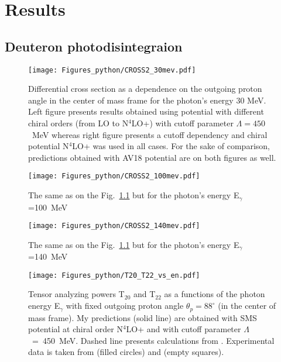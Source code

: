 \chapter{Results}

\section{Deuteron photodisintegraion}

    \begin{figure}[h]
        \begin{center}
        \texttt{[image: Figures\_python/CROSS2\_30mev.pdf]}
        \end{center}
        \caption{Differential cross section as a dependence on the outgoing proton angle in the center of mass frame 
        for the photon's energy 30 MeV. Left figure presents results obtained using potential
        with different chiral orders (from LO to N$^4$LO+) with cutoff parameter $\Lambda=450$~MeV
        whereas right figure presents a cutoff dependency and chiral potential N$^4$LO+ was used in all cases.
        For the sake of comparison, predictions obtained with AV18 potential are on both figures as well.}
        \label{CROSS_30}
    \end{figure}
        

    \begin{figure}[h]
        \begin{center}
        \texttt{[image: Figures\_python/CROSS2\_100mev.pdf]}
        \end{center}
        \caption{The same as on the Fig.~\ref{CROSS_30} but for the photon's energy E$_\gamma$=100~MeV}
        \label{CROSS_100}
    \end{figure}

    \begin{figure}[h]
        \begin{center}
        \texttt{[image: Figures\_python/CROSS2\_140mev.pdf]}
        \end{center}
        \caption{The same as on the Fig.~\ref{CROSS_30} but for the photon's energy E$_\gamma$=140~MeV}
        \label{CROSS_140}
    \end{figure}
        


    \begin{figure}[h]
        \begin{center}
        \texttt{[image: Figures\_python/T20\_T22\_vs\_en.pdf]}
        \end{center}
        \caption{Tensor analyzing powers T$_{20}$ and T$_{22}$ as a functions of the photon energy E$_\gamma$
        with fixed outgoing proton angle $\theta_p = 88^{\circ}$ (in the center of mass frame).
        My predictions (solid line) are obtained with SMS potential at chiral order N$^4$LO+
        and with cutoff parameter $\Lambda$~=~450~MeV.
        Dashed line presents calculations  from \cite{Schmitt1989}.
        Experimental data is taken from \cite{rachek2007} (filled circles)
        and \cite{mishev1993} (empty squares).}
        \label{T20_vs_en}
    \end{figure}


